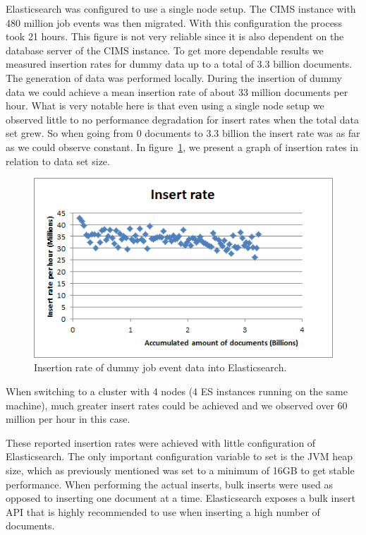 Elasticsearch was configured to use a single node setup. The CIMS instance with 480 million job events was then migrated. With this configuration the process took 21 hours. This figure is not very reliable since it is also dependent on the database server of the CIMS instance. To get more dependable results we measured insertion rates for dummy data up to a total of 3.3 billion documents. The generation of data was performed locally. During the insertion of dummy data we could achieve a mean insertion rate of about 33 million documents per hour. What is very notable here is that even using a single node setup we observed little to no performance degradation for insert rates when the total data set grew. So when going from 0 documents to 3.3 billion the insert rate was as far as we could observe constant. In figure~\ref{fig:insert_rate}, we present a graph of insertion rates in relation to data set size.
\begin{figure}[h!]
\centering
\includegraphics[]{figure/insert_rate.png}
\caption{Insertion rate of dummy job event data into Elasticsearch.}
\label{fig:insert_rate}
\end{figure}

When switching to a cluster with 4 nodes (4 ES instances running on the same machine), much greater insert rates could be achieved and we observed over 60 million per hour in this case.

These reported insertion rates were achieved with little configuration of Elasticsearch. The only important configuration variable to set is the JVM heap size, which as previously mentioned was set to a minimum of 16GB to get stable performance. When performing the actual inserts, bulk inserts were used as opposed to inserting one document at a time. Elasticsearch exposes a bulk insert API that is highly recommended to use when inserting a high number of documents.

